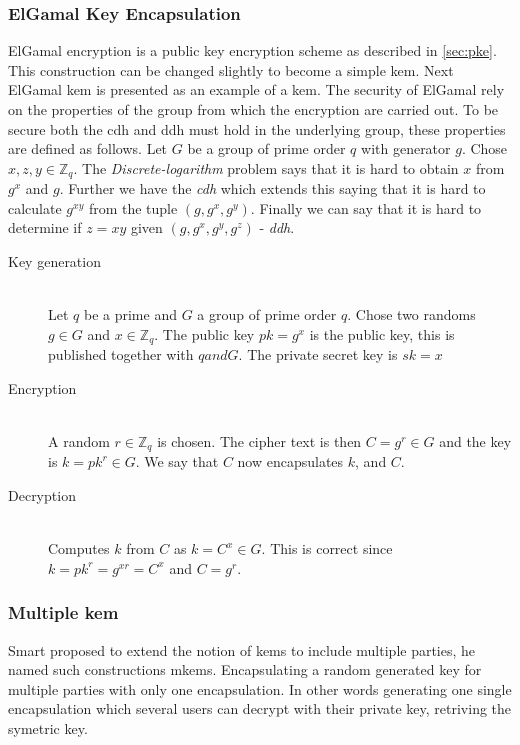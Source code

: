 \subsubsection{ElGamal Key Encapsulation \cite{elgamal-kem}}\label{subsubsec:elgamal}
ElGamal encryption is a public key encryption scheme as described in \ref{sec:pke}. This construction can be changed slightly to become a simple \gls{kem}. Next ElGamal \gls{kem} is presented as an example of a \gls{kem}. The security of ElGamal rely on the properties of the group from which the encryption are carried out. To be secure both the \gls{cdh} and \gls{ddh} must hold in the underlying group, these properties are defined as follows. Let $G$ be a group of prime order $q$ with generator $g$. Chose $x,z,y \in \mathbb{Z}_q$. The \emph{Discrete-logarithm} problem says that it is hard to obtain $x$ from $g^x$ and $g$. Further we have the \emph{\gls{cdh}} which extends this saying that it is hard to calculate $g^{xy}$ from the tuple $(g, g^x, g^y)$. Finally we can say that it is hard to determine if $z=xy$ given $(g, g^x, g^y, g^z)$ - \emph{\gls{ddh}}. 
\begin{description}
\item[Key generation]\hfill \\
Let $q$ be a prime and $G$ a group of prime order $q$. Chose two randoms $g \in G$ and $x \in \mathbb{Z}_q$. The public key $pk = g^x$ is the public key, this is published together with $q and G$. The private secret key is $sk = x$ 
\item[Encryption]\hfill \\
A random $r \in \mathbb{Z}_q$ is chosen. The cipher text is then $C = g^r \in G$ and the key is $k = pk^r \in G$. We say that $C$ now encapsulates $k$, and $C$.
\item[Decryption]\hfill \\
Computes $k$ from $C$ as $k = C^x \in G$. This is correct since \\$k = pk^r = g^{xr} = C^x$ and $ C = g^r$.
\end{description}




\subsubsection{Multiple \gls{kem}}\label{mkem}
Smart \cite{mkem} proposed to extend the notion of \glspl{kem} to include multiple parties, he named such constructions m\Glspl{kem}. Encapsulating a random generated key for multiple parties with only one encapsulation. In other words generating one single encapsulation which several users can decrypt with their private key, retriving the symetric key.




